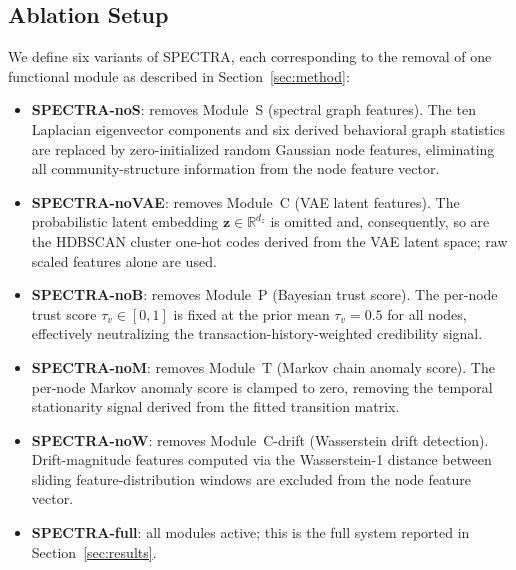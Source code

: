 \documentclass[journal]{IEEEtran}
\begin{document}

\subsection{Ablation Setup}
\label{subsec:ablation_setup}

We define six variants of SPECTRA, each corresponding to the removal of one
functional module as described in Section~\ref{sec:method}:

\begin{itemize}[leftmargin=*, itemsep=2pt]

  \item \textbf{SPECTRA-noS}: removes Module~S (spectral graph features).
    The ten Laplacian eigenvector components and six derived behavioral
    graph statistics are replaced by zero-initialized random Gaussian
    node features, eliminating all community-structure information from
    the node feature vector.

  \item \textbf{SPECTRA-noVAE}: removes Module~C (VAE latent features).
    The probabilistic latent embedding $\mathbf{z} \in \mathbb{R}^{d_z}$
    is omitted and, consequently, so are the HDBSCAN cluster one-hot codes
    derived from the VAE latent space; raw scaled features alone are used.

  \item \textbf{SPECTRA-noB}: removes Module~P (Bayesian trust score).
    The per-node trust score $\tau_v \in [0,1]$ is fixed at the prior mean
    $\tau_v = 0.5$ for all nodes, effectively neutralizing the
    transaction-history-weighted credibility signal.

  \item \textbf{SPECTRA-noM}: removes Module~T (Markov chain anomaly score).
    The per-node Markov anomaly score is clamped to zero, removing the
    temporal stationarity signal derived from the fitted transition matrix.

  \item \textbf{SPECTRA-noW}: removes Module~C-drift (Wasserstein drift
    detection).  Drift-magnitude features computed via the Wasserstein-1
    distance between sliding feature-distribution windows are excluded from
    the node feature vector.

  \item \textbf{SPECTRA-full}: all modules active; this is the full system
    reported in Section~\ref{sec:results}.

\end{itemize}
\end{document}
